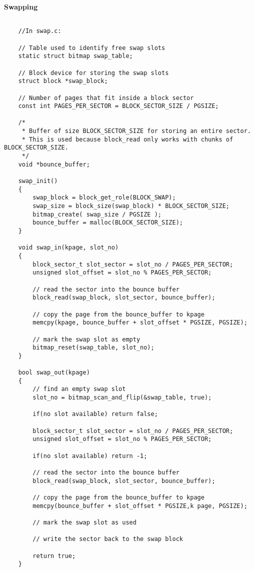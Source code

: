 \textbf{Swapping}

\begin{lstlisting}
	
	//In swap.c:
	
	// Table used to identify free swap slots
	static struct bitmap swap_table;

	// Block device for storing the swap slots
	struct block *swap_block;

	// Number of pages that fit inside a block sector
	const int PAGES_PER_SECTOR = BLOCK_SECTOR_SIZE / PGSIZE;

	/*
	 * Buffer of size BLOCK_SECTOR_SIZE for storing an entire sector.
	 * This is used because block_read only works with chunks of BLOCK_SECTOR_SIZE.
	 */
	void *bounce_buffer;

	swap_init()
	{
		swap_block = block_get_role(BLOCK_SWAP);
		swap_size = block_size(swap_block) * BLOCK_SECTOR_SIZE;
		bitmap_create( swap_size / PGSIZE );
		bounce_buffer = malloc(BLOCK_SECTOR_SIZE);
	}
	
	void swap_in(kpage, slot_no)
	{
		block_sector_t slot_sector = slot_no / PAGES_PER_SECTOR;
		unsigned slot_offset = slot_no % PAGES_PER_SECTOR;

		// read the sector into the bounce buffer
		block_read(swap_block, slot_sector, bounce_buffer);

		// copy the page from the bounce_buffer to kpage
		memcpy(kpage, bounce_buffer + slot_offset * PGSIZE, PGSIZE);

		// mark the swap slot as empty
		bitmap_reset(swap_table, slot_no);
	}
	
	bool swap_out(kpage)
	{
		// find an empty swap slot
		slot_no = bitmap_scan_and_flip(&swap_table, true);

		if(no slot available) return false;

		block_sector_t slot_sector = slot_no / PAGES_PER_SECTOR;
		unsigned slot_offset = slot_no % PAGES_PER_SECTOR;

		if(no slot available) return -1;

		// read the sector into the bounce buffer
		block_read(swap_block, slot_sector, bounce_buffer);

		// copy the page from the bounce_buffer to kpage
		memcpy(bounce_buffer + slot_offset * PGSIZE,k page, PGSIZE);

		// mark the swap slot as used

		// write the sector back to the swap block

		return true;
	}
	
\end{lstlisting}

